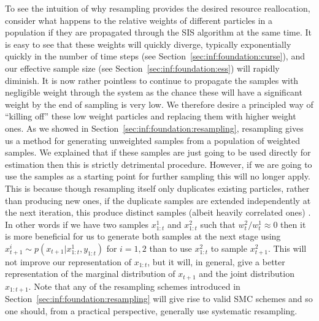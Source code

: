 To see the intuition of why resampling provides the desired resource reallocation, consider what happens 
to the relative weights of different particles in a population if they are propagated through the SIS algorithm at the
same time.  It is easy to see that these weights will quickly diverge, typically exponentially quickly in the
number of time steps (see Section~\ref{sec:inf:foundation:curse}), and our effective sample size 
(see Section~\ref{sec:inf:foundation:ess}) will rapidly diminish.  It is now rather pointless to continue to
propagate the samples with negligible weight through the system as the chance these will have a significant
weight by the end of sampling is very low.  We therefore desire a principled way of ``killing off'' these
low weight particles and replacing them with higher weight ones.  As we showed in Section~\ref{sec:inf:foundation:resampling},
resampling gives us a method for generating unweighted samples from a population of weighted samples.
We explained that if these samples are just going to be used directly for estimation then this is strictly
detrimental procedure.  However, if we are going to use the samples as a starting point for further sampling this
will no longer apply.  This is because though resampling itself only duplicates existing particles, rather
than producing new ones, if the duplicate samples are extended independently at the next iteration, this
produce distinct samples (albeit heavily correlated ones) .  In other words if we have two samples
$x_{1:t}^1$ and $x_{1:t}^2$ such that $w_t^2/w_t^1 \approx 0$ then it is more beneficial for us to generate both
samples at the next stage using $x_{t+1}^i \sim p(x_{t+1} | x_{1:t}^1, y_{1:t})$ for $i=1,2$ than to use
$x_{1:t}^2$ to sample $x_{t+1}^2$.  This will not improve our representation of $x_{1:t}$, but it will, in
general, give a better representation of the marginal distribution of $x_{t+1}$ and the joint distribution
$x_{1:t+1}$.   Note that any of the resampling schemes introduced in Section~\ref{sec:inf:foundation:resampling}
will give rise to valid SMC schemes and so one should, from a practical perspective, generally
use systematic resampling.


